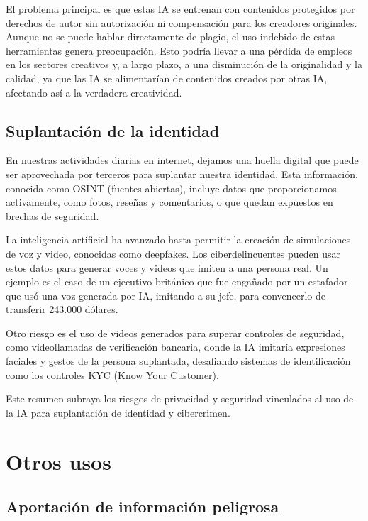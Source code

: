 \documentclass[12pt]{article}
\begin{document}
El problema principal es que estas IA se entrenan con contenidos protegidos por derechos de autor sin autorización ni compensación para los creadores originales. Aunque no se puede hablar directamente de plagio, el uso indebido de estas herramientas genera preocupación. Esto podría llevar a una pérdida de empleos en los sectores creativos y, a largo plazo, a una disminución de la originalidad y la calidad, ya que las IA se alimentarían de contenidos creados por otras IA, afectando así a la verdadera creatividad.

\subsection{Suplantación de la identidad}

En nuestras actividades diarias en internet, dejamos una huella digital que puede ser aprovechada por terceros para suplantar nuestra identidad. Esta información, conocida como OSINT (fuentes abiertas), incluye datos que proporcionamos activamente, como fotos, reseñas y comentarios, o que quedan expuestos en brechas de seguridad.

La inteligencia artificial ha avanzado hasta permitir la creación de simulaciones de voz y video, conocidas como deepfakes. Los ciberdelincuentes pueden usar estos datos para generar voces y videos que imiten a una persona real. Un ejemplo es el caso de un ejecutivo británico que fue engañado por un estafador que usó una voz generada por IA, imitando a su jefe, para convencerlo de transferir 243.000 dólares.

Otro riesgo es el uso de videos generados para superar controles de seguridad, como videollamadas de verificación bancaria, donde la IA imitaría expresiones faciales y gestos de la persona suplantada, desafiando sistemas de identificación como los controles KYC (Know Your Customer).

Este resumen subraya los riesgos de privacidad y seguridad vinculados al uso de la IA para suplantación de identidad y cibercrimen.

\section{Otros usos}
\subsection{Aportación de información peligrosa}
\end{document}
